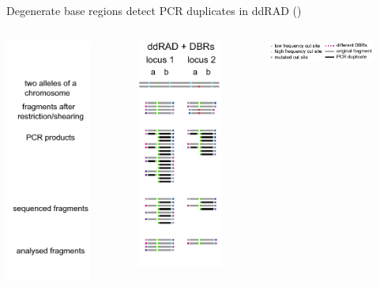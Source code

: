 \documentclass[presentation]{beamer}
\begin{document}
\begin{frame}[label=sec-3-2-3]{Degenerate base regions detect PCR duplicates in ddRAD (\citep{Tin2014,Schweyen2014})}
\vspace{0.1cm}

\begin{columns}
\begin{column}{0.3\columnwidth}
\begin{raggedright}
\includegraphics[width=2.8cm]{Schweyen2014Fig2a.png}
\end{raggedright}
\end{column}

\begin{column}{0.3\columnwidth}
\begin{raggedleft}
\includegraphics[width=2.8cm]{Schweyen2014Fig2d.png}
\end{raggedleft}
\end{column}

\begin{column}{0.3\columnwidth}
\begin{raggedleft}
\includegraphics[width=3.5cm]{Schweyen2014Fig2e.png}
\end{raggedleft}
\tiny{\citep{Schweyen2014}}
\end{column}
\end{columns}
\end{frame}
\end{document}
